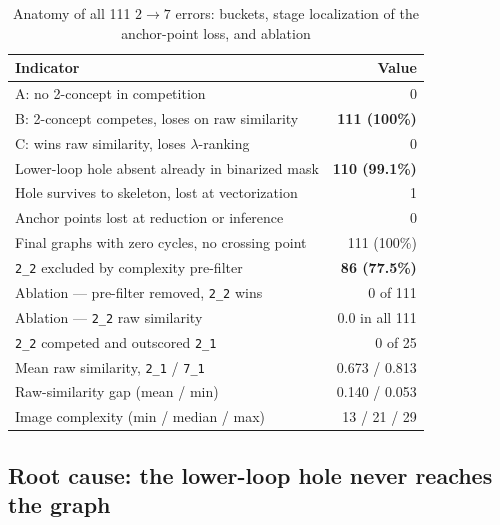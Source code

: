 \documentclass[conference]{IEEEtran}
\newcommand{\cid}[1]{\texttt{#1}}   %
\begin{document}
\begin{table}[!t]
\caption{Anatomy of all 111 $2{\to}7$ errors: buckets, stage
localization of the anchor-point loss, and ablation}
\label{tab:buckets}
\centering
\begin{tabular}{lr}
\toprule
Indicator & Value \\
\midrule
A: no 2-concept in competition & 0 \\
B: 2-concept competes, loses on raw similarity & \textbf{111 (100\%)} \\
C: wins raw similarity, loses $\lambda$-ranking & 0 \\
\midrule
Lower-loop hole absent already in binarized mask & \textbf{110 (99.1\%)} \\
Hole survives to skeleton, lost at vectorization & 1 \\
Anchor points lost at reduction or inference & 0 \\
Final graphs with zero cycles, no crossing point & 111 (100\%) \\
\midrule
\cid{2\_2} excluded by complexity pre-filter & \textbf{86 (77.5\%)} \\
Ablation --- pre-filter removed, \cid{2\_2} wins & 0 of 111 \\
Ablation --- \cid{2\_2} raw similarity & 0.0 in all 111 \\
\cid{2\_2} competed and outscored \cid{2\_1} & 0 of 25 \\
Mean raw similarity, \cid{2\_1} / \cid{7\_1} & 0.673 / 0.813 \\
Raw-similarity gap (mean / min) & 0.140 / 0.053 \\
Image complexity (min / median / max) & 13 / 21 / 29 \\
\bottomrule
\end{tabular}
\end{table}

\subsection{Root cause: the lower-loop hole never reaches the graph}
\end{document}
